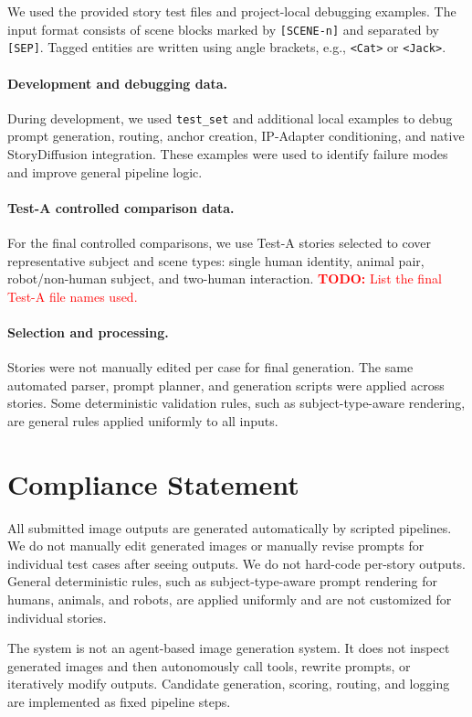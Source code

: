 \documentclass[11pt,a4paper]{article}
\newcommand{\todo}[1]{\textcolor{red}{\textbf{TODO:} #1}}
\begin{document}
We used the provided story test files and project-local debugging examples. The input format consists of scene blocks marked by \texttt{[SCENE-n]} and separated by \texttt{[SEP]}. Tagged entities are written using angle brackets, e.g., \texttt{<Cat>} or \texttt{<Jack>}.

\paragraph{Development and debugging data.}
During development, we used \texttt{test\_set} and additional local examples to debug prompt generation, routing, anchor creation, IP-Adapter conditioning, and native StoryDiffusion integration. These examples were used to identify failure modes and improve general pipeline logic.

\paragraph{Test-A controlled comparison data.}
For the final controlled comparisons, we use Test-A stories selected to cover representative subject and scene types: single human identity, animal pair, robot/non-human subject, and two-human interaction. \todo{List the final Test-A file names used.}

\paragraph{Selection and processing.}
Stories were not manually edited per case for final generation. The same automated parser, prompt planner, and generation scripts were applied across stories. Some deterministic validation rules, such as subject-type-aware rendering, are general rules applied uniformly to all inputs.

\section{Compliance Statement}
\label{sec:compliance}

All submitted image outputs are generated automatically by scripted pipelines. We do not manually edit generated images or manually revise prompts for individual test cases after seeing outputs. We do not hard-code per-story outputs. General deterministic rules, such as subject-type-aware prompt rendering for humans, animals, and robots, are applied uniformly and are not customized for individual stories.

The system is not an agent-based image generation system. It does not inspect generated images and then autonomously call tools, rewrite prompts, or iteratively modify outputs. Candidate generation, scoring, routing, and logging are implemented as fixed pipeline steps.
\end{document}
